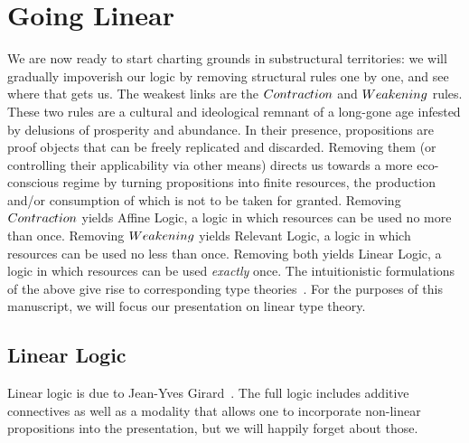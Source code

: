 \section{Going Linear}
We are now ready to start charting grounds in substructural territories: we will gradually impoverish our logic by removing structural rules one by one, and see where that gets us. 
The weakest links are the $Contraction{}$ and $Weakening{}$ rules.
These two rules are a cultural and ideological remnant of a long-gone age infested by delusions of prosperity and abundance.
In their presence, propositions are proof objects that can be freely replicated and discarded.
Removing them (or controlling their applicability via other means) directs us towards a more eco-conscious regime by turning propositions into finite resources, the production and/or consumption of which is not to be taken for granted.
Removing $Contraction{}$ yields Affine Logic, a logic in which resources can be used no more than once.
Removing $Weakening{}$ yields Relevant Logic, a logic in which resources can be used no less than once.
Removing both yields Linear Logic, a logic in which resources can be used \textit{exactly} once.
The intuitionistic formulations of the above give rise to corresponding type theories~\cite{pierce2004advanced}.
For the purposes of this manuscript, we will focus our presentation on linear type theory.

\subsection{Linear Logic}
Linear logic is due to Jean-Yves Girard~\cite{girard1987linear}.
The full logic includes additive connectives as well as a modality that allows one to incorporate non-linear propositions into the presentation, but we will happily forget about those.

